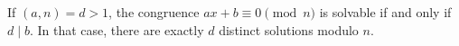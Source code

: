 If $(a, n) = d > 1$, the congruence $ax + b \equiv 0 \pmod{n}$ is solvable if and only if $d \mid b$. In that case, there are exactly $d$ distinct solutions modulo $n$.
